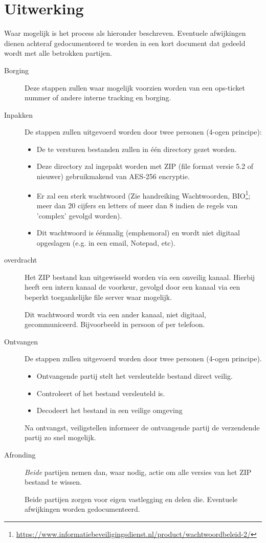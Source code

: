 \documentclass[11.0pt,twoside,openright]{report}
\begin{document}
\section*{Uitwerking}

Waar mogelijk is het process als hieronder beschreven. Eventuele afwijkingen dienen achteraf gedocumenteerd te worden in een kort document dat gedeeld wordt met alle betrokken partijen.

\begin{description}
\item[Borging] Deze stappen zullen waar mogelijk voorzien worden van een ops-ticket nummer of andere interne tracking en borging.
\item[Inpakken] De stappen zullen uitgevoerd worden door twee personen (4-ogen principe): 
\begin{itemize}
\item De te versturen bestanden zullen in één directory gezet worden.
\item Deze directory zal ingepakt worden met ZIP (file format versie 5.2 of nieuwer) gebruikmakend van AES-256 encryptie.
\item Er zal een sterk wachtwoord (Zie handreiking Wachtwoorden, BIO\footnote{\url{https://www.informatiebeveiligingsdienst.nl/product/wachtwoordbeleid-2/}}; meer dan 20 cijfers en letters of meer dan 8 indien de regels van 'complex' gevolgd worden).
\item Dit wachtwoord is éénmalig (emphemoral) en wordt niet digitaal opgeslagen (e.g. in een email, Notepad, etc). 
\end{itemize}

\item[overdracht] Het ZIP bestand kan uitgewisseld worden via een onveilig kanaal. Hierbij heeft een intern kanaal de voorkeur, gevolgd door een kanaal via een beperkt toegankelijke file server waar mogelijk. 

Dit wachtwoord wordt via een ander kanaal, niet digitaal, gecommuniceerd. Bijvoorbeeld in persoon of per telefoon.

\item[Ontvangen] De stappen zullen uitgevoerd worden door twee personen (4-ogen principe).

\begin{itemize}
\item Ontvangende partij stelt het versleutelde bestand direct veilig.
\item Controleert of het bestand versleuteld is.
\item Decodeert het bestand in een veilige omgeving
\end{itemize}

Na ontvangst, veiligstellen informeer de ontvangende partij de verzendende partij zo snel mogelijk.

\item[Afronding] \emph{Beide} partijen nemen dan, waar nodig, actie om alle versies van het ZIP bestand te wissen.

Beide partijen zorgen voor eigen vastlegging en delen die. Eventuele afwijkingen worden gedocumenteerd.
\end{description}
\end{document}
